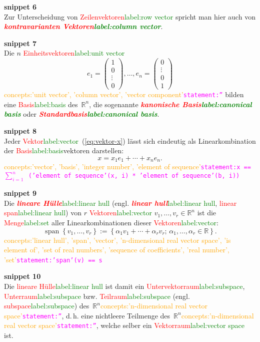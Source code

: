 \documentclass[a4paper,twoside,english,ngerman,deutsch,german,sectrefs,envcountsame,envcountchap]{svmono}
\newcommand{\setref}[2]{\textcolor{red}{#1}\textcolor{green}{#2}}
\newcommand{\snippet}[1]{\textbf{snippet #1}\\}
\newcommand{\eqnote}[2]{\textcolor{orange}{#1}\textcolor{magenta}{\texttt{#2}}}
\begin{document}
\snippet{6}
Zur Unterscheidung von \setref{Zeilenvektoren}{label:row vector} spricht man hier auch von \textbf{\em \setref{kontravarianten Vektoren}{label:column vector}}.

\snippet{7}
Die $n$ \setref{Einheitsvektoren}{label:unit vector}
\[
e_{1}=\left(\begin{array}{c} 1\\ 0\\
\vdots\\
0
\end{array}\right),\ldots,e_{n}=\left(\begin{array}{c}
0\\
\vdots\\
0\\ 1
\end{array}\right)
\]\eqnote{concepts:'unit vector', 'column vector', 'vector component'}{statement:''}
bilden eine \setref{Basis}{label:basis} des~${\mathbb{R}}^{n}$, die sogenannte \textbf{\em \setref{kanonische Basis}{label:canonical basis}} oder \textbf{\em \setref{Standardbasis}{label:canonical basis}}.

\snippet{8}
Jeder \setref{Vektor}{label:vector}~(\eqref{eq:vektor-x}) lässt sich eindeutig als Linearkombination der \setref{Basis}{label:basis}vektoren darstellen:
\[
x=x_{1}e_{1}+\cdots+x_{n}e_{n}.
\]\eqnote{concepts:'vector', 'basis', 'integer number', 'element of sequence'}{statement:x == $\sum_{i=1}^n$ ('element of sequence'(x, i) * 'element of sequence'(b, i))}

\snippet{9}
Die \setref{\textbf{\em lineare Hülle}}{label:linear hull} (engl. \setref{\textbf{\em linear hull}}{label:linear hull}, \setref{linear span}{label:linear hull}) von $r$ \setref{Vektoren}{label:vector} $v_{1},\ldots,v_{r}\in{\mathbb{R}}^{n}$ ist die \setref{Menge}{label:set} aller Linearkombinationen dieser \setref{Vektoren}{label:vector}:
\[
{\operatorname{span}}\left\{ v_{1},\ldots,v_{r}\right\} :=\left\{ \alpha_{1}v_{1}+\cdots+\alpha_{r}v_{r};\,\alpha_{1},\ldots,\alpha_{r}\in{\mathbb{R}}\right\} .
\]\eqnote{concepts:'linear hull', 'span', 'vector', 'n-dimensional real vector space', 'is element of', 'set of real numbers', 'sequence of coefficients', 'real number', 'set'}{statement:'span'(v) == s}

\snippet{10}
Die \setref{lineare Hülle}{label:linear hull} ist damit ein \setref{Untervektorraum}{label:subspace}, \setref{Unterraum}{label:subspace} bzw. \setref{Teilraum}{label:subspace} (engl. \setref{subspace}{label:subspace}) des~${\mathbb{R}}^{n}$\eqnote{concepts:'n-dimensional real vector space'}{statement:''}, d.\,h. eine nichtleere Teilmenge des~${\mathbb{R}}^{n}$\eqnote{concepts:'n-dimensional real vector space'}{statement:''}, welche selber ein \setref{Vektorraum}{label:vector space} ist.
\end{document}
